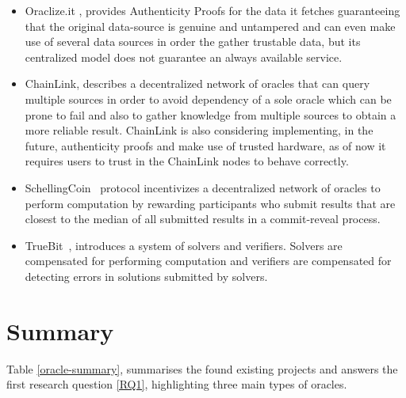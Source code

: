 \begin{itemize}
  \item Oraclize.it \citet{Oraclize.it2018}, provides Authenticity Proofs for the data it fetches guaranteeing that the original data-source is genuine and untampered and can even make use of several data sources in order the gather trustable data, but its centralized model does not guarantee an always available service.
  \item ChainLink\citet{Ellis2017}, describes a decentralized network of oracles that can query multiple sources in order to avoid dependency of a sole oracle which can be prone to fail and also to gather knowledge from multiple sources to obtain a more reliable result. ChainLink is also considering implementing, in the future, authenticity proofs and make use of trusted hardware, as of now it requires users to trust in the ChainLink nodes to behave correctly.
  \item SchellingCoin~\citet{VitalikButerin2014} protocol incentivizes a decentralized network of oracles to perform computation by rewarding participants who submit results that are closest to the median of all submitted results in a commit-reveal process.
  \item TrueBit~\citet{Teutsch2017}, introduces a system of solvers and verifiers. Solvers are compensated for performing computation and verifiers are compensated for detecting errors in solutions submitted by solvers.
\end{itemize}




\section{Summary}

Table \ref{oracle-summary}, summarises the found existing projects and answers the first research question \ref{RQ1}, highlighting three main types of oracles.


